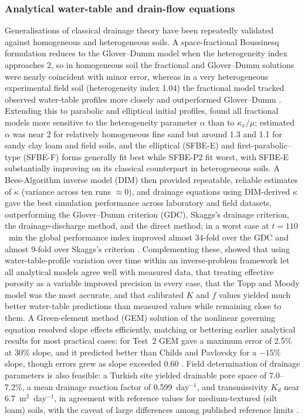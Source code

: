 \subsubsection{Analytical water-table and drain-flow equations}

Generalisations of classical drainage theory have been repeatedly validated
against homogeneous and heterogeneous soils. A space-fractional Boussinesq
formulation reduces to the Glover--Dumm model when the heterogeneity index
approaches 2, so in homogeneous soil the fractional and Glover--Dumm solutions
were nearly coincident with minor error, whereas in a very heterogeneous
experimental field soil (heterogeneity index 1.04) the fractional model tracked
observed water-table profiles more closely and outperformed Glover--Dumm
\parencite{Mehdinejadiani2013}. Extending this to parabolic and elliptical
initial profiles, \textcite{Mehdinejadiani2020} found all fractional models more
sensitive to the heterogeneity parameter $\alpha$ than to $\kappa_x/\mu$;
estimated $\alpha$ was near 2 for relatively homogeneous fine sand but around
1.3 and 1.1 for sandy clay loam and field soils, and the elliptical (SFBE-E) and
first-parabolic--type (SFBE-F) forms generally fit best while SFBE-P2 fit worst,
with SFBE-E substantially improving on its classical counterpart in
heterogeneous soils. A Bees-Algorithm inverse model (DIM) then provided
repeatable, reliable estimates of $\kappa$ (variance across ten runs
$\approx0$), and drainage equations using DIM-derived $\kappa$ gave the best
simulation performance across laboratory and field datasets, outperforming the
Glover--Dumm criterion (GDC), Skaggs's drainage criterion, the drainage-discharge
method, and the direct method; in a worst case at $t=110$~min the global
performance index improved almost 34-fold over the GDC and almost 9-fold over
Skaggs's criterion \parencite{Mehdinejadiani2022}. Complementing these,
\textcite{Samani2007} showed that using water-table-profile variation over time
within an inverse-problem framework let all analytical models agree well with
measured data, that treating effective porosity as a variable improved precision
in every case, that the Topp and Moody model was the most accurate, and that
calibrated $K$ and $f$ values yielded much better water-table predictions than
measured values while remaining close to them. A Green-element method (GEM)
solution of the nonlinear governing equation resolved slope effects efficiently,
matching or bettering earlier analytical results for most practical cases: for
Test~2 GEM gave a maximum error of 2.5\% at 30\% slope, and it predicted better
than Childs and Pavlovsky for a $-15$\% slope, though errors grew as slope
exceeded 0.60 \parencite{Onyejekwe1999}. Field determination of drainage
parameters is also feasible: a Turkish site yielded drainable pore space of
7.0--7.2\%, a mean drainage reaction factor of 0.599~day$^{-1}$, and
transmissivity $K_d$ near 6.7~m$^2$~day$^{-1}$, in agreement with reference
values for medium-textured (silt loam) soils, with the caveat of large
differences among published reference limits \parencite{Bahceci2008}.

